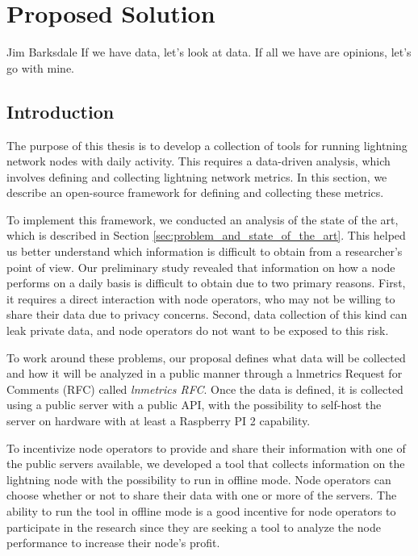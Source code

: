 \chapter{Proposed Solution}

\begin{chapquote}{Jim Barksdale}
If we have data, let’s look at data. If all we have are opinions, let’s go with mine.
\end{chapquote}

\section{Introduction}

The purpose of this thesis is to develop a collection of tools for running lightning network 
nodes with daily activity. This requires a data-driven analysis, which involves defining 
and collecting lightning network metrics. In this section, we describe an open-source 
framework for defining and collecting these metrics.

To implement this framework, we conducted an analysis of the state of the art, 
which is described in Section \ref{sec:problem_and_state_of_the_art}. This helped us 
better understand which information is difficult to obtain from a researcher's point 
of view. Our preliminary study revealed that information on how a node performs on a 
daily basis is difficult to obtain due to two primary reasons. First, it requires a direct 
interaction with node operators, who may not be willing to share their data due to 
privacy concerns. Second, data collection of this kind can leak private data, 
and node operators do not want to be exposed to this risk.

To work around these problems, our proposal defines what data will be collected 
and how it will be analyzed in a public manner through a lnmetrics Request for Comments (RFC) 
called \emph{lnmetrics RFC}. Once the data is defined, it is collected using a public 
server with a public API, with the possibility to self-host the server on hardware 
with at least a Raspberry PI 2 capability.

To incentivize node operators to provide and share their information with one
of the public servers available, we developed a tool that collects information on 
the lightning node with the possibility to run in offline mode. Node operators can 
choose whether or not to share their data with one or more of the servers. The ability 
to run the tool in offline mode is a good incentive for node operators to participate 
in the research since they are seeking a tool to analyze the node performance to 
increase their node's profit.

